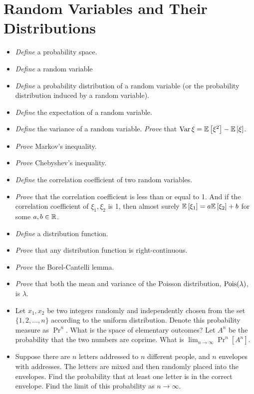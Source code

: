 \documentclass{article}
\newcommand{\cold}{{\color{babyblue}{\Snowflake}}}
\newcommand{\elegant}{{\color{brickred}{\ding{46}}}}
\newcommand{\prac}{{\color{arsenic}{\ding{43}}}}
\begin{document}
\section{Random Variables and Their Distributions}
\begin{itemize}[nosep]
    \item[\cold] \textit{Define} a probability space.
    \item[\cold] \textit{Define} a random variable
    \item[\cold] \textit{Define} a probability distribution of a random variable (or the probability distribution induced by a random variable).
    \item[\cold] \textit{Define} the expectation of a random variable. 
    \item[\cold] \textit{Define} the variance of a random variable. \textit{Prove} that $\operatorname{Var}{\xi} = \mathbb{E}\left[\xi^2\right] - \mathbb{E}\left[\xi\right]$.
    \item[\prac] \textit{Prove} Markov's inequality.
    \item[\prac] \textit{Prove} Chebyshev's inequality.
    \item[\cold] \textit{Define} the correlation coefficient of two random variables. 
    \item[\prac] \textit{Prove} that the correlation coefficient is less than or equal to 1. And if the correlation coefficient of $\xi_1,\xi_2$ is 1, then almost surely $\mathbb{E}\left[\xi_1\right] = a\mathbb{E}\left[\xi_2\right] + b$ for some $a,b \in \mathbb{R}$. 
    \item[\prac] \textit{Define} a distribution function. 
    \item[\prac] \textit{Prove} that any distribution function is right-continuous.
    \item[\cold] \textit{Prove} the Borel-Cantelli lemma. 
    \item[\prac] \textit{Prove} that both the mean and variance of the Poisson distribution, $\operatorname{Pois}(\lambda)$, is $\lambda$. 
    \item[\elegant] Let $x_1,x_2$ be two integers randomly and independently chosen from the set $\{1,2,\ldots,n\}$ according to the uniform distribution. Denote this probability measure as $\Pr^n$. What is the space of elementary outcomes? Let $A^n$ be the probability that the two numbers are coprime. What is $\lim_{n\to\infty} \Pr^n[A^n]$. 
    \item[\elegant] Suppose there are $n$ letters addressed to $n$ different people, and $n$ envelopes with addresses. The letters are mixed and then randomly placed into the envelopes. Find the probability that at least one letter is in the correct envelope. Find the limit of this probability as $n\to\infty$.
\end{itemize}
\end{document}
